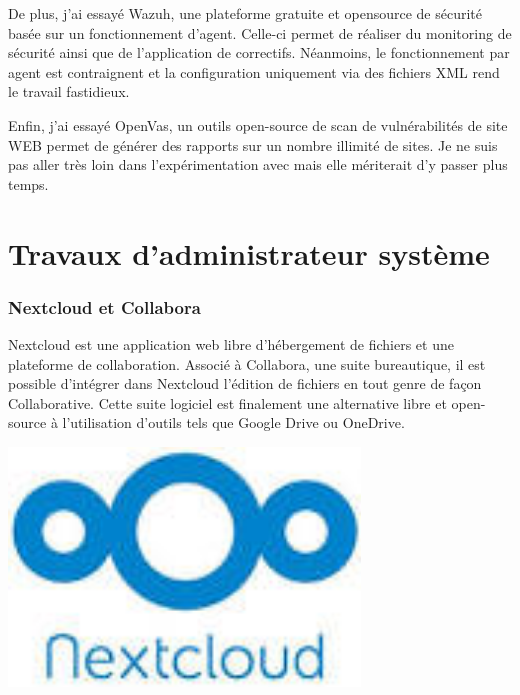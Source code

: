 \documentclass[12pt, a4paper, twoside]{article}
\begin{document}
De plus, j'ai essayé Wazuh, une plateforme gratuite et opensource de sécurité basée sur un fonctionnement d'agent. 
Celle-ci permet de réaliser du monitoring de sécurité ainsi que de l'application de correctifs.
Néanmoins, le fonctionnement par agent est contraignent et la configuration uniquement via des fichiers XML rend le travail fastidieux.

Enfin, j'ai essayé OpenVas, un outils open-source de scan de vulnérabilités de site WEB permet de générer des rapports sur un nombre illimité de sites. 
Je ne suis pas aller très loin dans l'expérimentation avec mais elle mériterait d'y passer plus temps.

\newpage
\part{Travaux d'administrateur système}
\section{Nextcloud et Collabora}
\noindent%
\begin{minipage}{.7\textwidth}%
\gls{Nextcloud} est une application web libre d'hébergement de fichiers et une plateforme de collaboration. 
Associé à \gls{Collabora}, une suite bureautique, il est possible d'intégrer dans \gls{Nextcloud} l'édition de fichiers en tout genre de façon Collaborative. 
Cette suite logiciel est finalement une alternative libre et open-source à l'utilisation d'outils tels que Google Drive ou OneDrive.
\end{minipage}%
\hfill
\begin{minipage}{.3\textwidth}%
\begin{center}
\includegraphics[width=0.7\textwidth]{src/logo_nextcloud.jpeg}
\end{center}
\end{minipage}%
\end{document}
